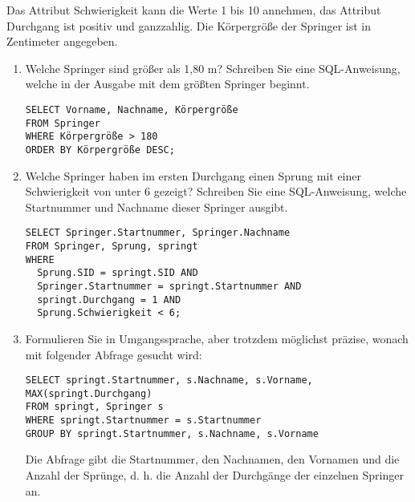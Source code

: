 \documentclass{bschlangaul-aufgabe}
\begin{document}
\noindent
Das Attribut Schwierigkeit kann die Werte 1 bis 10 annehmen, das
Attribut Durchgang ist positiv und ganzzahlig. Die Körpergröße der
Springer ist in Zentimeter angegeben.

\begin{enumerate}


\item Welche Springer sind größer als 1,80 m? Schreiben Sie eine
SQL-Anweisung, welche in der Ausgabe mit dem größten Springer beginnt.

\begin{bAntwort}
\begin{verbatim}
SELECT Vorname, Nachname, Körpergröße
FROM Springer
WHERE Körpergröße > 180
ORDER BY Körpergröße DESC;
\end{verbatim}
\end{bAntwort}


\item Welche Springer haben im ersten Durchgang einen Sprung mit einer
Schwierigkeit von unter 6 gezeigt? Schreiben Sie eine SQL-Anweisung,
welche Startnummer und Nachname dieser Springer ausgibt.

\begin{bAntwort}
\begin{verbatim}
SELECT Springer.Startnummer, Springer.Nachname
FROM Springer, Sprung, springt
WHERE
  Sprung.SID = springt.SID AND
  Springer.Startnummer = springt.Startnummer AND
  springt.Durchgang = 1 AND
  Sprung.Schwierigkeit < 6;
\end{verbatim}
\end{bAntwort}


\item Formulieren Sie in Umgangssprache, aber trotzdem möglichst
präzise, wonach mit folgender Abfrage gesucht wird:

\begin{verbatim}
SELECT springt.Startnummer, s.Nachname, s.Vorname, MAX(springt.Durchgang)
FROM springt, Springer s
WHERE springt.Startnummer = s.Startnummer
GROUP BY springt.Startnummer, s.Nachname, s.Vorname
\end{verbatim}

\begin{bAntwort}
Die Abfrage gibt die Startnummer, den Nachnamen, den Vornamen und
die Anzahl der Sprünge, d. h. die Anzahl der Durchgänge der
einzelnen Springer an.
\end{bAntwort}


\end{enumerate}
\end{document}
